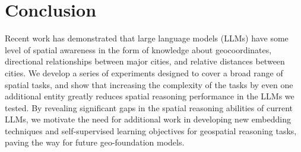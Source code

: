 \section{Conclusion}
\label{section:conclusion}
\normalsize


Recent work has demonstrated that large language models (LLMs) have some level of spatial awareness in the form of knowledge about geocoordinates, directional relationships between major cities, and relative distances between cities.
We develop a series of experiments designed to cover a broad range of spatial tasks, and show that increasing the complexity of the tasks by even one additional entity greatly reduces spatial reasoning performance in the LLMs we tested.
By revealing significant gaps in the spatial reasoning abilities of current LLMs, we motivate the need for additional work in developing new embedding techniques and self-supervised learning objectives for geospatial reasoning tasks, paving the way for future geo-foundation models.



%
%
%
%
